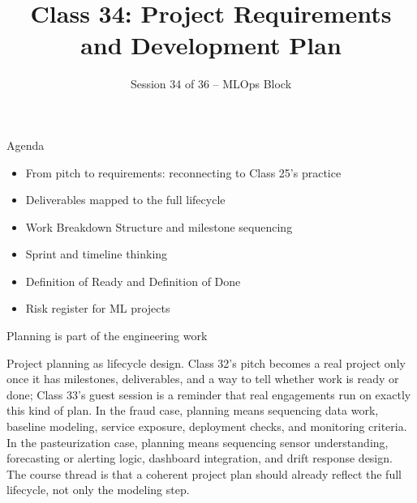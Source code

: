 

\title{Class 34: Project Requirements and Development Plan}
\subtitle{Session 34 of 36 -- MLOps Block}
\author{\coursename}
\date{}



\frame{\titlepage \coursefooter}

\begin{frame}{Agenda}
\begin{itemize}
\item From pitch to requirements: reconnecting to Class 25's practice
\item Deliverables mapped to the full lifecycle
\item Work Breakdown Structure and milestone sequencing
\item Sprint and timeline thinking
\item Definition of Ready and Definition of Done
\item Risk register for ML projects
\end{itemize}
\coursefooter
\end{frame}

\begin{frame}{Planning is part of the engineering work}
\coursefooter
\end{frame}

\coursecontextframe
{Project planning as lifecycle design.}
{Class 32's pitch becomes a real project only once it has milestones, deliverables, and a way to tell whether work is ready or done; Class 33's guest session is a reminder that real engagements run on exactly this kind of plan.}
{In the fraud case, planning means sequencing data work, baseline modeling, service exposure, deployment checks, and monitoring criteria.}
{In the pasteurization case, planning means sequencing sensor understanding, forecasting or alerting logic, dashboard integration, and drift response design.}
{The course thread is that a coherent project plan should already reflect the full lifecycle, not only the modeling step.}

